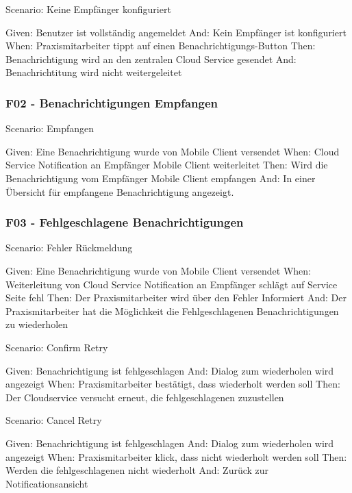         Scenario: Keine Empfänger konfiguriert

        Given:  Benutzer ist vollständig angemeldet
        And:    Kein Empfänger ist konfiguriert
        When:   Praxismitarbeiter tippt auf einen Benachrichtigungs-Button
        Then:   Benachrichtigung wird an den zentralen Cloud Service gesendet
        And:    Benachrichtitung wird nicht weitergeleitet



    \subsubsection*{F02 - Benachrichtigungen Empfangen}

        Scenario: Empfangen

        Given:  Eine Benachrichtigung wurde von Mobile Client versendet
        When:   Cloud Service Notification an Empfänger Mobile Client weiterleitet
        Then:   Wird die Benachrichtigung vom Empfänger Mobile Client empfangen
        And:    In einer Übersicht für empfangene Benachrichtigung angezeigt.


    \subsubsection*{F03 - Fehlgeschlagene Benachrichtigungen}

        Scenario: Fehler Rückmeldung

        Given:  Eine Benachrichtigung wurde von Mobile Client versendet
        When:   Weiterleitung von Cloud Service Notification an Empfänger schlägt auf Service Seite fehl
        Then:   Der Praxismitarbeiter wird über den Fehler Informiert
        And:    Der Praxismitarbeiter hat die Möglichkeit die Fehlgeschlagenen Benachrichtigungen zu wiederholen

        Scenario: Confirm Retry

        Given:  Benachrichtigung ist fehlgeschlagen
        And:    Dialog zum wiederholen wird angezeigt
        When:   Praxismitarbeiter bestätigt, dass wiederholt werden soll
        Then:   Der Cloudservice versucht erneut, die fehlgeschlagenen zuzustellen

        Scenario: Cancel Retry

        Given:  Benachrichtigung ist fehlgeschlagen
        And:    Dialog zum wiederholen wird angezeigt
        When:   Praxismitarbeiter klick, dass nicht wiederholt werden soll
        Then:   Werden die fehlgeschlagenen nicht wiederholt
        And:    Zurück zur Notificationsansicht


